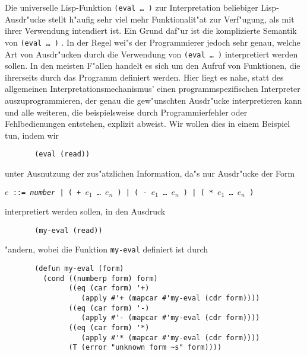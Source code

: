 Die universelle Lisp-Funktion {\tt (eval\,\ldots\,)} zur
Interpretation beliebiger Lisp-Ausdr"ucke stellt h"aufig sehr viel
mehr Funktionalit"at zur Verf"ugung, als mit ihrer Verwendung
intendiert ist. Ein Grund daf"ur ist die komplizierte Semantik von
{\tt (eval\,\ldots\,)} \cite{Wand/Friedman86}.  In der Regel wei"s der
Programmierer jedoch sehr genau, welche Art von Ausdr"ucken durch die
Verwendung von {\tt (eval\,\ldots\,)} interpretiert werden sollen. In
den meisten F"allen handelt es sich um den Aufruf von Funktionen, die
ihrerseits durch das Programm definiert werden. Hier liegt es nahe,
statt des allgemeinen Interpretationsmechanismus' einen
programmspezifischen Interpreter auszuprogrammieren, der genau die
gew"unschten Ausdr"ucke interpretieren kann und alle weiteren, die
beispielsweise durch Programmierfehler oder Fehlbedienungen entstehen,
explizit abweist.  Wir wollen dies in einem Beispiel tun, indem wir

\begin{verbatim}
       (eval (read))
\end{verbatim}

unter Ausnutzung der zus"atzlichen Information, da"s nur Ausdr"ucke
der Form
\vspace*{0.5cm}

\centerline{\tt $e$ ::= {\it number} | (\,+ $e_1$\,\ldots\,$e_n$\,) | 
(\,- $e_1$\,\ldots\,$e_n$\,) | (\,* $e_1$\,\ldots\,$e_n$\,)}

\vspace*{0.3cm}
interpretiert werden sollen, in den Ausdruck

\begin{verbatim}
       (my-eval (read))
\end{verbatim}

"andern, wobei die Funktion {\tt my-eval} definiert ist durch

\begin{verbatim}
       (defun my-eval (form)
         (cond ((numberp form) form)
               ((eq (car form) '+) 
                  (apply #'+ (mapcar #'my-eval (cdr form))))
               ((eq (car form) '-) 
                  (apply #'- (mapcar #'my-eval (cdr form))))
               ((eq (car form) '*) 
                  (apply #'* (mapcar #'my-eval (cdr form))))
               (T (error "unknown form ~s" form))))
\end{verbatim}

